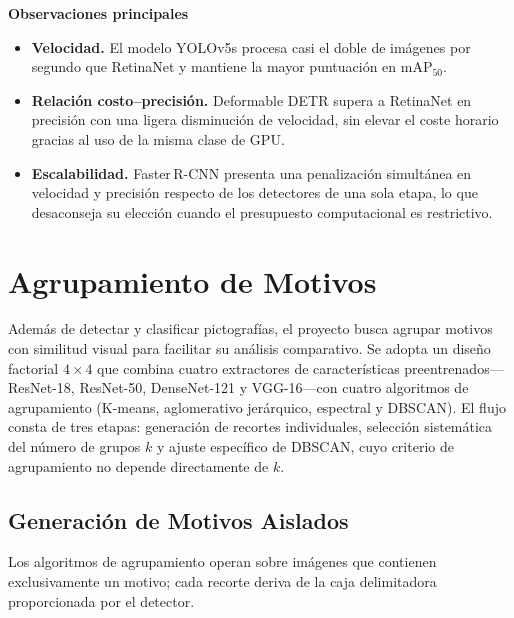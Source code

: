 
\textbf{Observaciones principales}
\begin{itemize}
  \item \textbf{Velocidad.}
        El modelo YOLOv5s procesa casi el doble de imágenes por segundo que RetinaNet y mantiene la mayor puntuación en \(\text{mAP}_{50}\).
  \item \textbf{Relación costo–precisión.}
        Deformable DETR supera a RetinaNet en precisión con una ligera disminución de velocidad, sin elevar el coste horario gracias al uso de la misma clase de GPU.
  \item \textbf{Escalabilidad.}
        Faster\,R-CNN presenta una penalización simultánea en velocidad y precisión respecto de los detectores de una sola etapa, lo que desaconseja su elección cuando el presupuesto computacional es restrictivo.
\end{itemize}

\section{Agrupamiento de Motivos}\label{sec:agrupamiento}

Además de detectar y clasificar pictografías, el proyecto busca agrupar motivos con similitud visual para facilitar su análisis comparativo.
Se adopta un diseño factorial \(4\times4\) que combina cuatro extractores de características preentrenados—ResNet-18, ResNet-50, DenseNet-121 y VGG-16—con cuatro algoritmos de agrupamiento (K-means, aglomerativo jerárquico, espectral y DBSCAN).
El flujo consta de tres etapas: generación de recortes individuales, selección sistemática del número de grupos \(k\) y ajuste específico de DBSCAN, cuyo criterio de agrupamiento no depende directamente de \(k\).

\subsection{Generación de Motivos Aislados}\label{ssec:crop_motifs}

Los algoritmos de agrupamiento operan sobre imágenes que contienen exclusivamente un motivo; cada recorte deriva de la caja delimitadora proporcionada por el detector.

